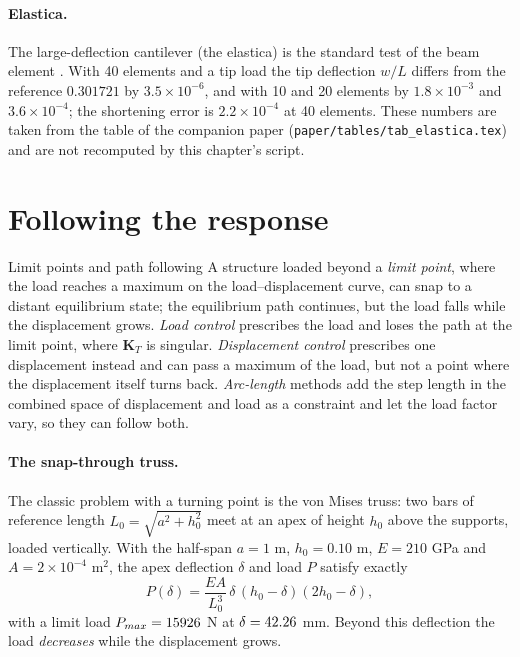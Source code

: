\paragraph{Elastica.}\label{sec:nl-elastica}
The large-deflection cantilever (the elastica) is the standard test of the beam element . With 40 elements and a tip load the tip deflection $w/L$ differs from the reference $0.301721$ by $3.5\times10^{-6}$, and with 10 and 20 elements by $1.8\times10^{-3}$ and $3.6\times10^{-4}$; the shortening error is $2.2\times10^{-4}$ at 40 elements. These numbers are taken from the table of the companion paper (\texttt{paper/tables/tab\_elastica.tex}) and are not recomputed by this chapter's script.

\section{Following the response}\label{sec:nl-paths}

\begin{sidenote}{Limit points and path following}
A structure loaded beyond a \emph{limit point}, where the load reaches a maximum on the load--displacement curve, can snap to a distant equilibrium state; the equilibrium path continues, but the load falls while the displacement grows. \emph{Load control} prescribes the load and loses the path at the limit point, where $\bm K_T$ is singular. \emph{Displacement control} prescribes one displacement instead and can pass a maximum of the load, but not a point where the displacement itself turns back. \emph{Arc-length} methods add the step length in the combined space of displacement and load as a constraint and let the load factor vary, so they can follow both.
\end{sidenote}

\paragraph{The snap-through truss.}
The classic problem with a turning point is the von Mises truss: two bars of reference length $L_0=\sqrt{a^2+h_0^2}$ meet at an apex of height $h_0$ above the supports, loaded vertically. With the half-span $a=1$ m, $h_0=0.10$ m, $E=210$ GPa and $A=2\times10^{-4}$ m$^2$, the apex deflection $\delta$ and load $P$ satisfy exactly
\begin{equation}\label{eq:nl-vm}
P(\delta)=\frac{EA}{L_0^{3}}\,\delta\,(h_0-\delta)(2h_0-\delta),
\end{equation}
with a limit load $P_{max}=15926$ N at $\delta=42.26$ mm. Beyond this deflection the load \emph{decreases} while the displacement grows.

